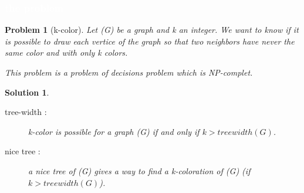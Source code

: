 \documentclass[8pt]{beamer}
\newtheorem*{pb}{Problem}
\newtheorem*{sol}{Solution}
\begin{document}
\begin{frame}
  \frametitle{ \textcolor{white}{the problem}}
\begin{pb}[k-color]
Let (G) be a graph and k an integer. We want to know if it is possible to draw each vertice of the graph so that two neighbors have never the same color and with only k colors.

This problem is a problem of decisions problem which is NP-complet.
  \end{pb}

  \begin{sol}
  \begin{description}
  \item[tree-width :] k-color is possible for a graph (G) if and only if $k> treewidth(G)$.
  \item[nice tree :] a nice tree of (G) gives a way to find a k-coloration of (G) (if $k> treewidth(G)$).
  \end{description}
\end{sol}



\end{frame}










\renewcommand\a{\textcolor{red}{a}}
\renewcommand\b{\textcolor{blue}{b}}
\renewcommand\c{\textcolor{green}{c}}
\renewcommand\d{\textcolor{blue}{d}}
\newcommand\e{\textcolor{green}{e}}
\newcommand\f{\textcolor{red}{f}}
\newcommand\g{\textcolor{green}{g}}
\newcommand\h{\textcolor{red}{h}}
\end{document}
